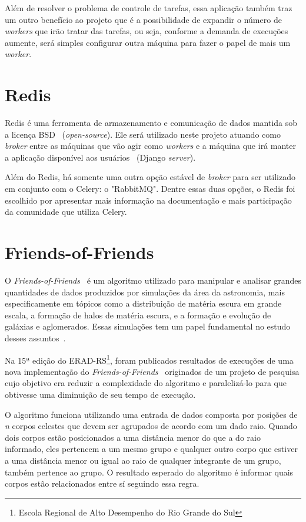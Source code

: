 \documentclass[tg]{mdtufsm}
\begin{document}
Além de resolver o problema de controle de tarefas, essa aplicação também traz um outro benefício ao projeto que é a possibilidade de expandir o número de \emph{workers} que irão tratar das tarefas, ou seja, conforme a demanda de execuções aumente, será simples configurar outra máquina para fazer o papel de mais um \emph{worker}.

\section{Redis}
Redis \cite{redis} é uma ferramenta de armazenamento e comunicação de dados mantida sob a licença BSD ~(\emph{open-source}). Ele será utilizado neste projeto atuando como \emph{broker} entre as máquinas que vão agir como \emph{workers} e a máquina que irá manter a aplicação disponível aos usuários ~(Django \emph{server}). 

Além do Redis, há somente uma outra opção estável de \emph{broker} para ser utilizado em conjunto com o Celery: o "RabbitMQ". Dentre essas duas opções, o Redis foi escolhido por apresentar mais informação na documentação e mais participação da comunidade que utiliza Celery.

\section{Friends-of-Friends}
O \emph{Friends-of-Friends}~\cite{friendsalg} é um algoritmo utilizado para manipular e analisar grandes quantidades de dados produzidos por simulações da área da astronomia, mais especificamente em tópicos como a distribuição de matéria escura em grande escala, a formação de halos de matéria escura, e a formação e evolução de galáxias e aglomerados. Essas simulações tem um papel fundamental no estudo desses assuntos~\cite{Bertschinger,Efstathiou}.

Na 15ª edição do ERAD-RS\footnote{Escola Regional de Alto Desempenho do Rio Grande do Sul}, foram publicados resultados de execuções de uma nova implementação do \emph{Friends-of-Friends}~\cite{friends} originados de um projeto de pesquisa cujo objetivo era reduzir a complexidade do algoritmo e paralelizá-lo para que obtivesse uma diminuição de seu tempo de execução.

O algoritmo funciona utilizando uma entrada de dados composta por posições de \emph{n} corpos celestes que devem ser agrupados de acordo com um dado raio. Quando dois corpos estão posicionados a uma distância menor do que a do raio informado, eles pertencem a um mesmo grupo e qualquer outro corpo que estiver a uma distância menor ou igual ao raio de qualquer integrante de um grupo, também pertence ao grupo. O resultado esperado do algoritmo é informar quais corpos estão relacionados entre sí seguindo essa regra.
\end{document}
